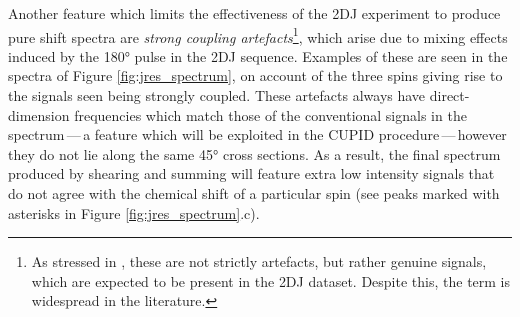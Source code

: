 Another feature which limits the effectiveness of the \ac{2DJ} experiment to
produce pure shift spectra are
\emph{strong coupling artefacts}\footnote{
    As stressed in \cite{Thrippleton2005}, these are not strictly artefacts,
    but rather genuine signals, which are expected to be present in the
    \ac{2DJ} dataset. Despite this, the term is widespread in the literature.
},
which arise due to mixing effects induced by the \ang{180} pulse in the
\ac{2DJ} sequence\cite{Wider1983,Thrippleton2005}. Examples of these are seen
in the spectra of Figure \ref{fig:jres_spectrum}, on account of the three spins
giving rise to the signals seen being strongly coupled. These artefacts always
have direct-dimension frequencies which match those of the conventional signals
in the spectrum\,---\,a feature which will be exploited in the \ac{CUPID}
procedure\,---\,however they do not lie along the same \ang{45} cross
sections. As a result, the final spectrum produced by shearing and summing will
feature extra low intensity signals that do not agree with the chemical shift
of a particular spin (see peaks marked with asterisks in Figure
\ref{fig:jres_spectrum}.c).

